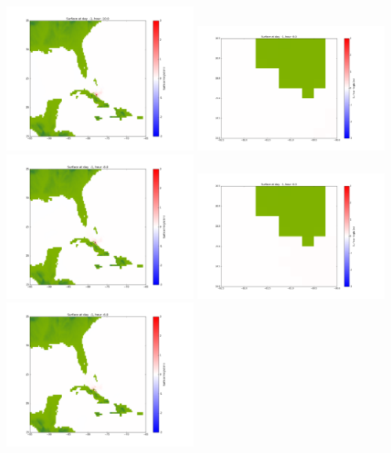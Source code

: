 \documentclass[11pt]{article}
\begin{document}
\includegraphics[width=0.475\textwidth]{frame0007fig1002.png}
\vskip 10pt 
\includegraphics[width=0.475\textwidth]{frame0008fig1001.png}
\includegraphics[width=0.475\textwidth]{frame0008fig1002.png}
\vskip 10pt 
\includegraphics[width=0.475\textwidth]{frame0009fig1001.png}
\includegraphics[width=0.475\textwidth]{frame0009fig1002.png}
\end{document}
